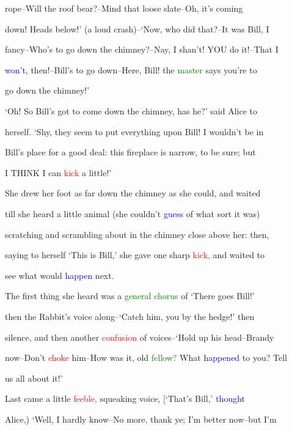  rope--Will the roof bear?--Mind that loose slate--Oh, it’s coming

 down! Heads below!’ (a loud crash)--‘Now, who did that?--It was Bill, I

 fancy--Who’s to go down the chimney?--Nay, I shan’t! YOU do it!--That I

 \textcolor{blue}{won’t,} then!--Bill’s to go down--Here, Bill! the \textcolor{green}{master} says you’re to

 go down the chimney!’



 ‘Oh! So Bill’s got to come down the chimney, has he?’ said Alice to

 herself. ‘Shy, they seem to put everything upon Bill! I wouldn’t be in

 Bill’s place for a \textcolor{BurntOrange}{good} \textcolor{BurntOrange}{deal:} this fireplace is narrow, to be sure; but

 I THINK I can \textcolor{red}{kick} a little!’



 She drew her foot as far down the chimney as she could, and \textcolor{BurntOrange}{waited}

 till she heard a little animal (she couldn’t \textcolor{blue}{guess} of what sort it was)

 scratching and scrambling about in the chimney close above her: then,

 saying to herself ‘This is Bill,’ she gave one sharp \textcolor{red}{kick,} and \textcolor{BurntOrange}{waited} to

 see what would \textcolor{blue}{happen} next.



 The first thing she heard was a \textcolor{green}{general} \textcolor{green}{chorus} of ‘There goes Bill!’

 then the Rabbit’s voice along--‘Catch him, you by the hedge!’ then

 silence, and then another \textcolor{red}{confusion} of voices--‘Hold up his head--Brandy

 now--Don’t \textcolor{red}{choke} him--How was it, old \textcolor{green}{fellow?} What \textcolor{blue}{happened} to you? Tell

 us all about it!’



 Last came a little \textcolor{red}{feeble,} squeaking voice, [‘That’s Bill,’ \textcolor{blue}{thought}

 Alice,) ‘Well, I hardly know--No more, thank ye; I’m better now--but I’m

